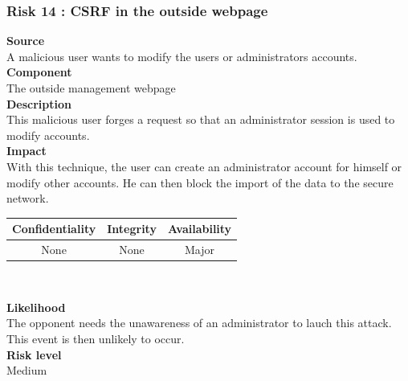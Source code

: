 \documentclass[a4paper,11pt]{article}
\begin{document}
\subsubsection{Risk 14 : CSRF in the outside webpage}
\textbf{Source} \\A malicious user wants to modify the users or administrators accounts.\\
\textbf{Component} \\The outside management webpage\\
\textbf{Description}\\This malicious user forges a request so that an administrator session is used to modify accounts.   \\
\textbf{Impact}\\
With this technique, the user can create an administrator account for himself or modify other accounts. He can then block the import of the data to the secure network. \\
\begin{center}
\begin{tabular}{|c|c|c|}
\hline
\textbf{Confidentiality} & \textbf{Integrity} & \textbf{Availability} \\
\hline
None & None & Major \\
\hline
\end{tabular}\\
\end{center}
\textbf{Likelihood}\\The opponent needs the unawareness of an administrator to lauch this attack. This event is then unlikely to occur.\\
\textbf{Risk level}\\Medium\\
\end{document}
